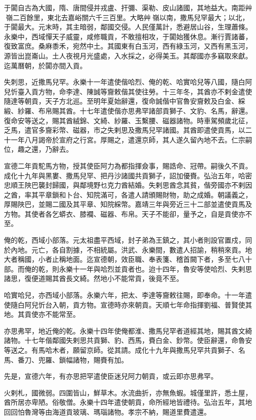 \begin{pinyinscope}
于闐自古為大國，隋、唐間侵并戎盧、扞彌、渠勒、皮山諸國，其地益大。南距艸嶺二百餘里，東北去嘉峪關六千三百里。大略艸嶺以南，撒馬兒罕最大；以北，于闐最大。元末時，其主暗弱，鄰國交侵。人民僅萬計，悉避居山谷，生理蕭條。永樂中，西域憚天子威靈，咸修職貢，不敢擅相攻，于闐始獲休息。漸行賈諸蕃，復致富庶。桑麻黍禾，宛然中土。其國東有白玉河，西有綠玉河，又西有黑玉河，源皆出崑崙山。土人夜視月光盛處，入水採之，必得美玉。其鄰國亦多竊取來獻。迄萬曆朝，於闐亦間入貢。

失刺思，近撒馬兒罕。永樂十一年遣使偕哈烈、俺的乾、哈實哈兒等八國，隨白阿兒忻臺入貢方物，命李達、陳誠等齎敕偕其使往勞。十三年冬，其酋亦不剌金遣使隨達等朝貢，天子方北巡。至明年夏始辭還，復命誠偕中官魯安齎敕及白金、綵緞、紗羅、布帛賜其酋。十七年遣使偕亦思弗罕諸部貢獅子、文豹、名馬，辭還。復命安等送之，賜其酋絨錦、文綺、紗羅、玉繫腰、磁器諸物。時車駕頻歲北征，乏馬，遣官多齎彩幣、磁器，市之失剌思及撒馬兒罕諸國。其酋即遣使貢馬，以二十一年八月謁帝於宣府之行宮。厚賜之，遣還京師，其人遂久留內地不去。仁宗嗣位，趣之還，乃辭去。

宣德二年貢駝馬方物，授其使臣阿力為都指揮僉事，賜誥命、冠帶。嗣後久不貢。成化十九年與黑婁、撒馬兒罕、把丹沙諸國共貢獅子，詔加優賚。弘治五年，哈密忠順王陜巴襲封歸國，與鄰境野乜克力酋結婚。失剌思酋念其貧，偕旁國亦不剌因之酋，率其平章鎖和卜台、知院滿可，各遣人請頒賜財物，助之成婚。朝議義之，厚賜陜巴，並賜二國及其平章、知院綵幣。嘉靖三年與旁近三十二部並遣使貢馬及方物。其使者各乞蟒衣、膝襴、磁器、布帛。天子不能卻，量予之，自是貢使亦不至。

俺的乾，西域小部落。元太祖盡平西域，封子弟為王鎮之，其小者則設官置戍，同於內地。元亡，各自割據，不相統屬。洪武、永樂間，數遣人招諭，稍稍來貢。地大者稱國，小者止稱地面。迄宣德朝，效臣職、奉表箋、稽首闕下者，多至七八十部。而俺的乾，則永樂十一年與哈烈並貢者也。迨十四年，魯安等使哈烈、失剌思諸思，復便道賜其酋長文綺。然地小不能常貢，後竟不至。

哈實哈兒，亦西域小部落。永樂六年，把太、李達等齎敕往賜，即奉命。十一年遣使隨白阿兒忻台入朝，貢方物。宣德時亦來朝貢。天順七年命指揮劉福、普賢使其地。其貢使亦不能常至。

亦思弗罕，地近俺的乾。永樂十四年使俺都淮、撒馬兒罕者道經其地，賜其酋文綺諸物。十七年偕鄰國失剌思共貢獅、豹、西馬，賚白金、鈔幣。使臣辭還，命魯安等送之。有馬哈木者，願留京師。從其請。成化十九年與撒馬兒罕共貢獅子、名馬、番刀、兜羅、鎖幅諸物，賜賚有加。

先是，宣德六年，有亦思把罕遣使臣迷兒阿力朝貢，或云即亦思弗罕。

火剌札，國微弱。四圍皆山，鮮草木。水流曲折，亦無魚蝦。城僅里許，悉土屋，酋所居亦卑陋。俗敬僧。永樂十四年遣使朝貢，命所經地皆禮待。弘治五年，其地回回怕魯灣等由海道貢玻璃、瑪瑙諸物。孝宗不納，賜道里費遣還。


\end{pinyinscope}
